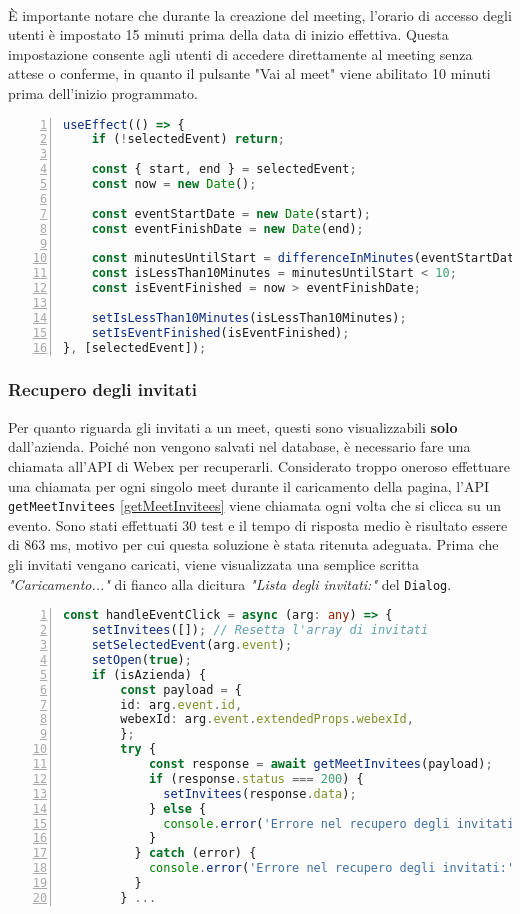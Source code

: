 \\
È importante notare che durante la creazione del meeting, l'orario di accesso degli utenti è impostato 15 minuti 
prima della data di inizio effettiva. Questa impostazione consente agli utenti di accedere direttamente al meeting 
senza attese o conferme, in quanto il pulsante "Vai al meet" viene abilitato 10 minuti prima dell'inizio programmato.
\begin{lstlisting}[language=typescript, frame=lines, basicstyle=\ttfamily\scriptsize, numbers=left, 
    label={useEffect_per_la_logica_dei_pulsanti}, caption={useEffect per la logica dei pulsanti}]
useEffect(() => {
    if (!selectedEvent) return;
      
    const { start, end } = selectedEvent;
    const now = new Date();
      
    const eventStartDate = new Date(start);
    const eventFinishDate = new Date(end);
      
    const minutesUntilStart = differenceInMinutes(eventStartDate, now);
    const isLessThan10Minutes = minutesUntilStart < 10;
    const isEventFinished = now > eventFinishDate;
      
    setIsLessThan10Minutes(isLessThan10Minutes);
    setIsEventFinished(isEventFinished);
}, [selectedEvent]);
\end{lstlisting}
\subsubsection{Recupero degli invitati}
Per quanto riguarda gli invitati a un meet, questi sono visualizzabili \textbf{solo} dall'azienda. 
Poiché non vengono salvati nel database, è necessario fare una chiamata all'API di Webex per recuperarli.
Considerato troppo oneroso effettuare una chiamata per ogni singolo meet durante il caricamento della 
pagina, l'API \texttt{getMeetInvitees} \ref{getMeetInvitees} viene chiamata ogni 
volta che si clicca su un evento. Sono stati effettuati 30 test e il tempo di risposta medio è 
risultato essere di 863 ms, motivo per cui questa soluzione è stata ritenuta adeguata. 
Prima che gli invitati vengano caricati, viene visualizzata 
una semplice scritta \textit{"Caricamento..."} di fianco alla dicitura \textit{"Lista degli invitati:"}
del \texttt{Dialog}.

\begin{lstlisting}[language=typescript, frame=lines, basicstyle=\ttfamily\scriptsize, numbers=left, 
    label={getMeetInvitees}, caption={chiamata all'api getMeetInvitees effettuata se l'utente è un'azienda}]
const handleEventClick = async (arg: any) => {
    setInvitees([]); // Resetta l'array di invitati
    setSelectedEvent(arg.event);
    setOpen(true);
    if (isAzienda) {
        const payload = {
        id: arg.event.id,
        webexId: arg.event.extendedProps.webexId,
        };   
        try {
            const response = await getMeetInvitees(payload);
            if (response.status === 200) {
              setInvitees(response.data);
            } else {
              console.error('Errore nel recupero degli invitati:', response.statusText);
            }
          } catch (error) {
            console.error('Errore nel recupero degli invitati:', error);
          }
        } ...
\end{lstlisting}
